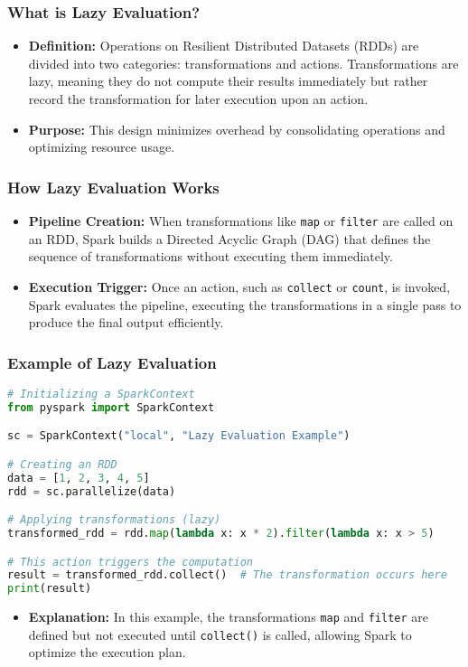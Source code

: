 \documentclass[aspectratio=169]{beamer}
\begin{document}
\begin{frame}[fragile]
    \frametitle{What is Lazy Evaluation?}
    \begin{itemize}
        \item \textbf{Definition:} 
        Operations on Resilient Distributed Datasets (RDDs) are divided into two categories: transformations and actions. Transformations are lazy, meaning they do not compute their results immediately but rather record the transformation for later execution upon an action.
        \item \textbf{Purpose:} 
        This design minimizes overhead by consolidating operations and optimizing resource usage.
    \end{itemize}
\end{frame}

\begin{frame}[fragile]
    \frametitle{How Lazy Evaluation Works}
    \begin{itemize}
        \item \textbf{Pipeline Creation:}
        When transformations like \texttt{map} or \texttt{filter} are called on an RDD, Spark builds a Directed Acyclic Graph (DAG) that defines the sequence of transformations without executing them immediately.
        
        \item \textbf{Execution Trigger:}
        Once an action, such as \texttt{collect} or \texttt{count}, is invoked, Spark evaluates the pipeline, executing the transformations in a single pass to produce the final output efficiently.
    \end{itemize}
\end{frame}

\begin{frame}[fragile]
    \frametitle{Example of Lazy Evaluation}
    \begin{lstlisting}[language=Python]
# Initializing a SparkContext
from pyspark import SparkContext

sc = SparkContext("local", "Lazy Evaluation Example")

# Creating an RDD
data = [1, 2, 3, 4, 5]
rdd = sc.parallelize(data)

# Applying transformations (lazy)
transformed_rdd = rdd.map(lambda x: x * 2).filter(lambda x: x > 5)

# This action triggers the computation
result = transformed_rdd.collect()  # The transformation occurs here
print(result)
    \end{lstlisting}
    \begin{itemize}
        \item \textbf{Explanation:} 
        In this example, the transformations \texttt{map} and \texttt{filter} are defined but not executed until \texttt{collect()} is called, allowing Spark to optimize the execution plan.
    \end{itemize}
\end{frame}
\end{document}
